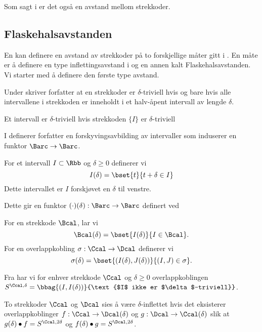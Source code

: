 Som sagt i  er det også en
avstand mellom strekkoder.

\subsection{Flaskehalsavstanden}
En kan definere en avstand av strekkoder på to
forskjellige måter gitt i \cite{Bauer2018}. En måte er
å definere en type inflettingsavstand i \Barc og en annen
kalt Flaskehalsavstanden. Vi starter med å definere den
første type avstand.

\begin{bemerk}\label{bem:strek_triv}
  Under \citep[definisjon 1.3]{Bauer2018} skriver
  forfatter at en strekkoder er $\delta$-triviell hvis og
  bare hvis alle intervallene i strekkoden er inneholdt
  i et halv-åpent intervall av lengde $\delta$.
\end{bemerk}

\begin{bemerk}\label{bem:int_triv}
  Et intervall er $\delta$-triviell hvis strekkoden
  $\{I\}$ er $\delta$-triviell
\end{bemerk}

I \citep[seksjon 2.5]{Bauer2018} definerer forfatter en
forskyvingsavbilding av intervaller som induserer en
funktor $\Barc\to\Barc$.
\begin{definisjon}\label{def:IntSkyv}
    For et intervall $I\subset\Rbb$ og $\delta\geq 0$ definerer vi
    \[I(\delta) = \bset{t}{t+\delta\in I}\]
    Dette intervallet er $I$ forskjøvet en $\delta$ til venstre.
\end{definisjon}

Dette gir en funktor $(\cdot)(\delta):\Barc\to\Barc$ definert ved

\begin{definisjon}
    For en strekkode $\Bcal$, lar vi
    \[\Bcal(\delta) = \bset{I(\delta)}{I\in\Bcal}.\]
    For en overlappkobling $\sigma:\Ccal\to\Dcal$ definerer vi
    \[\sigma(\delta) = \bset{(I(\delta),J(\delta))}{(I,J)\in\sigma}.\]
\end{definisjon}

Fra \cite{Bauer2018} har vi for enhver strekkode $\Ccal$
og $\delta\geq0$ overlappkoblingen $S^{\Ccal,\delta}
= \bbag{(I,I(\delta))}{\text{$I$ ikke er
$\delta$-triviell}}$.

\begin{definisjon}\label{def:InfBar}
To strekkoder $\Ccal$ og $\Dcal$ sies å være
  $\delta$-inflettet hvis det eksisterer overlappkoblinger
  $f:\Ccal\to \Dcal(\delta)$ og $g:\Dcal\to\Ccal(\delta)$
  slik at $g(\delta)\bullet f = S^{\Ccal,2\delta}$ og
  $f(\delta)\bullet g=S^{\Dcal,2\delta}$.
\end{definisjon}

